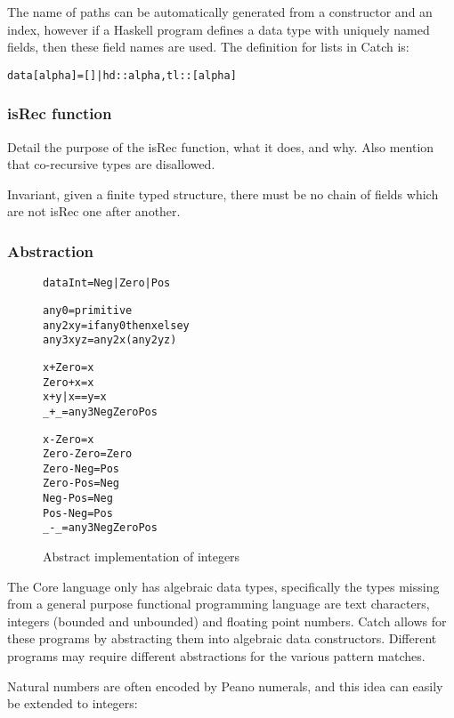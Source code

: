 \documentclass[preprint]{sigplanconf}
\newcommand{\C}[1]{\textsf{#1}}
\newenvironment{code}{\begin{alltt}\small}{\end{alltt}}
\begin{document}
The name of paths can be automatically generated from a constructor and an index, however if a Haskell program defines a data type with uniquely named fields, then these field names are used. The definition for lists in Catch is:

\begin{code}
data [alpha] = [] | {hd :: alpha, tl :: [alpha]}
\end{code}

\subsubsection{\C{isRec} function}

Detail the purpose of the \C{isRec} function, what it does, and why. Also mention that co-recursive types are disallowed.

Invariant, given a finite typed structure, there must be no chain of fields which are not \C{isRec} one after another.

\subsubsection{Abstraction}

\begin{figure}
\begin{code}
data Int = Neg | Zero | Pos

any0 = primitive
any2 x y = if any0 then x else y
any3 x y z = any2 x (any2 y z)

x     + Zero  = x
Zero  + x     = x
x     + y     | x == y = x
_     + _     = any3 Neg Zero Pos

x     - Zero  = x
Zero  - Zero  = Zero
Zero  - Neg   = Pos
Zero  - Pos   = Neg
Neg   - Pos   = Neg
Pos   - Neg   = Pos
_     - _     = any3 Neg Zero Pos
\end{code}
\caption{Abstract implementation of integers}
\label{fig:abstract_int}
\end{figure}

The Core language only has algebraic data types, specifically the types missing from a general purpose functional programming language are text characters, integers (bounded and unbounded) and floating point numbers. Catch allows for these programs by abstracting them into algebraic data constructors. Different programs may require different abstractions for the various pattern matches.

Natural numbers are often encoded by Peano numerals, and this idea can easily be extended to integers:
\end{document}
